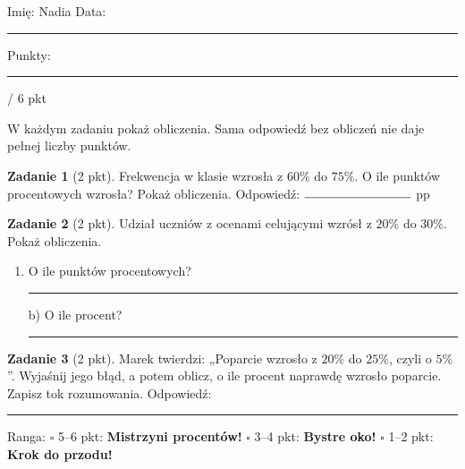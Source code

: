 \documentclass[11pt,a4paper]{article}
\begin{document}

\vspace{0.2em}
Imię: Nadia \hfill Data: \rule{3cm}{0.4pt} \hfill Punkty: \rule{1.2cm}{0.4pt} / 6 pkt

{\small W każdym zadaniu pokaż obliczenia. Sama odpowiedź bez obliczeń nie daje pełnej liczby punktów.}

\vspace{0.4em}

\textbf{Zadanie 1} (2 pkt). Frekwencja w klasie wzrosła z $60\%$ do $75\%$. O ile punktów procentowych wzrosła? Pokaż obliczenia.
\miejsce{3cm}
Odpowiedź: $\rule{3cm}{0.4pt}$ pp

\vspace{0.4em}
\textbf{Zadanie 2} (2 pkt). Udział uczniów z ocenami celującymi wzrósł z $20\%$ do $30\%$. Pokaż obliczenia.
\begin{enumerate}[label=\alph*), leftmargin=*, itemsep=2pt]
  \item O ile punktów procentowych? \rule{2.5cm}{0.4pt} \hspace{0.5cm} b) O ile procent? \rule{2.5cm}{0.4pt}
\end{enumerate}
\miejsce{4.5cm}

\textbf{Zadanie 3} (2 pkt). Marek twierdzi: „Poparcie wzrosło z $20\%$ do $25\%$, czyli o $5\%$”. Wyjaśnij jego błąd, a potem oblicz, o ile procent naprawdę wzrosło poparcie. Zapisz tok rozumowania.
\miejsce{5cm}
Odpowiedź: \rule{4cm}{0.4pt}

\vfill
\begin{tcolorbox}[colback=white, colframe=cel, boxrule=0.6pt, arc=2pt]
Ranga: \quad $\square$ 5--6 pkt: \textbf{Mistrzyni procentów!} \quad $\square$ 3--4 pkt: \textbf{Bystre oko!} \quad $\square$ 1--2 pkt: \textbf{Krok do przodu!}
\end{tcolorbox}
\end{document}

